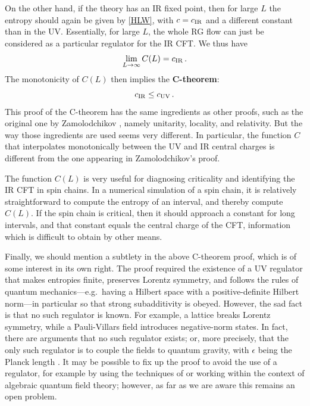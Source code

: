 \documentclass[11pt]{article}
\begin{document}
On the other hand, if the theory has an IR fixed point, then for large $L$ the entropy should again be given by \eqref{HLW}, with $c=c_{\rm IR}$ and a different constant than in the UV. Essentially, for large $L$, the whole RG flow can just be considered as a particular regulator for the IR CFT. We thus have
\begin{equation}
\lim_{L\to\infty}C(L) = c_{\rm IR}\,.
\end{equation}
The monotonicity of $C(L)$ then implies the \textbf{C-theorem}:
\begin{equation}\label{C theorem}
 c_{\rm IR}\le c_{\rm UV}\,.
\end{equation}
This proof of the C-theorem has the same ingredients as other proofs, such as the original one by Zamolodchikov \cite{Zamolodchikov:1986gt}, namely unitarity, locality, and relativity. But the way those ingredients are used seems very different. In particular, the function $C$ that interpolates monotonically between the UV and IR central charges is different from the one appearing in Zamolodchikov's proof.

The function $C(L)$ is very useful for diagnosing criticality and identifying the IR CFT in spin chains. In a numerical simulation of a spin chain, it is relatively straightforward to compute the entropy of an interval, and thereby compute $C(L)$. If the spin chain is critical, then it should approach a constant for long intervals, and that constant equals the central charge of the CFT, information which is difficult to obtain by other means.

Finally, we should mention a subtlety in the above C-theorem proof, which is of some interest in its own right. The proof required the existence of a UV regulator that  makes entropies finite, preserves Lorentz symmetry, and follows the rules of quantum mechanics---e.g.\ having a Hilbert space with a positive-definite Hilbert norm---in particular so that strong subadditivity is obeyed. However, the sad fact is that no such regulator is known. For example, a lattice breaks Lorentz symmetry, while a Pauli-Villars field introduces negative-norm states. In fact, there are arguments that no such regulator exists; or, more precisely, that the only such regulator is to couple the fields to quantum gravity, with $\epsilon$ being the Planck length \cite{Jacobson:2015hqa}. It may be possible to fix up the proof to avoid the use of a regulator, for example by using the techniques of \cite{Casini:2015woa} or working within the context of algebraic quantum field theory; however, as far as we are aware this remains an open problem.
\end{document}
